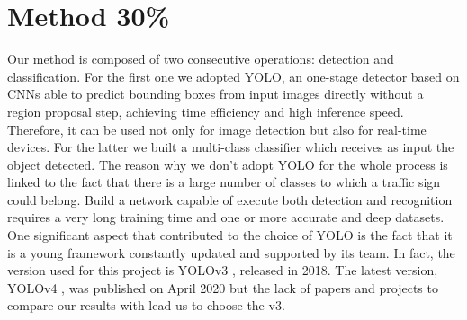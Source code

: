 \section{Method 30\%}
Our method is composed of two consecutive operations: detection and classification. For the first one we adopted YOLO, an one-stage detector based on CNNs able to predict bounding boxes from input images directly without a region proposal step, achieving time efficiency and high inference speed. Therefore, it can be used not only for image detection but also for real-time devices. For the latter we built a multi-class classifier which receives as input the object detected. The reason why we don't adopt YOLO for the whole process is linked to the fact that there is a large number of classes to which a traffic sign could belong. Build a network capable of execute both detection and recognition requires a very long training time and one or more accurate and deep datasets.\\ 
One significant aspect that contributed to the choice of YOLO is the fact that it is a young framework constantly updated and supported by its team. In fact, the version used for this project is YOLOv3 \cite{yolov3}, released in 2018. The latest version, YOLOv4 \cite{yolov4}, was published on April 2020 but the lack of papers and projects to compare our results with lead us to choose the v3. 

